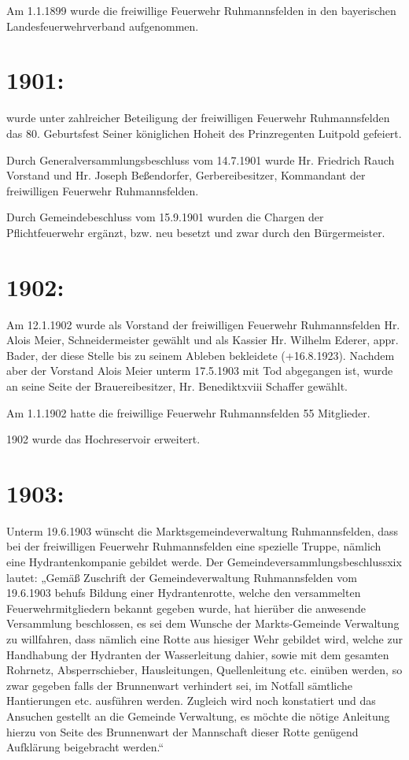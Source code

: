 \documentclass[12pt,a4paper]{book}
\begin{document}
Am 1.1.1899 wurde die freiwillige Feuerwehr Ruhmannsfelden in den bayerischen
Landesfeuerwehrverband aufgenommen.

\section{1901:}

wurde unter zahlreicher Beteiligung der freiwilligen Feuerwehr Ruhmannsfelden
das 80. Geburtsfest Seiner königlichen Hoheit des Prinzregenten Luitpold
gefeiert.

Durch Generalversammlungsbeschluss vom 14.7.1901 wurde Hr. Friedrich Rauch
Vorstand und Hr. Joseph Beßendorfer, Gerbereibesitzer, Kommandant der
freiwilligen Feuerwehr Ruhmannsfelden.

Durch Gemeindebeschluss vom 15.9.1901 wurden die Chargen der Pflichtfeuerwehr
ergänzt, bzw. neu besetzt und zwar durch den Bürgermeister.

\section{1902:}

Am 12.1.1902 wurde als Vorstand der freiwilligen Feuerwehr Ruhmannsfelden Hr.
Alois Meier, Schneidermeister gewählt und als Kassier Hr. Wilhelm Ederer, appr.
Bader, der diese Stelle bis zu seinem Ableben bekleidete (+16.8.1923). Nachdem
aber der Vorstand Alois Meier unterm 17.5.1903 mit Tod abgegangen ist, wurde an
seine Seite der Brauereibesitzer, Hr. Benediktxviii Schaffer gewählt.

Am 1.1.1902 hatte die freiwillige Feuerwehr Ruhmannsfelden 55 Mitglieder.

1902 wurde das Hochreservoir erweitert.

\section{1903:}

Unterm 19.6.1903 wünscht die Marktsgemeindeverwaltung Ruhmannsfelden, dass bei
der freiwilligen Feuerwehr Ruhmannsfelden eine spezielle Truppe, nämlich eine
Hydrantenkompanie gebildet werde. Der Gemeindeversammlungsbeschlussxix lautet:
„Gemäß Zuschrift der Gemeindeverwaltung Ruhmannsfelden vom 19.6.1903 behufs
Bildung einer Hydrantenrotte, welche den versammelten Feuerwehrmitgliedern
bekannt gegeben wurde, hat hierüber die anwesende Versammlung beschlossen, es
sei dem Wunsche der Markts-Gemeinde Verwaltung zu willfahren, dass nämlich eine
Rotte aus hiesiger Wehr gebildet wird, welche zur Handhabung der Hydranten der
Wasserleitung dahier, sowie mit dem gesamten Rohrnetz, Absperrschieber,
Hausleitungen, Quellenleitung etc. einüben werden, so zwar gegeben falls der
Brunnenwart verhindert sei, im Notfall sämtliche Hantierungen etc. ausführen
werden. Zugleich wird noch konstatiert und das Ansuchen gestellt an die Gemeinde
Verwaltung, es möchte die nötige Anleitung hierzu von Seite des Brunnenwart der
Mannschaft dieser Rotte genügend Aufklärung beigebracht werden.“
\end{document}
